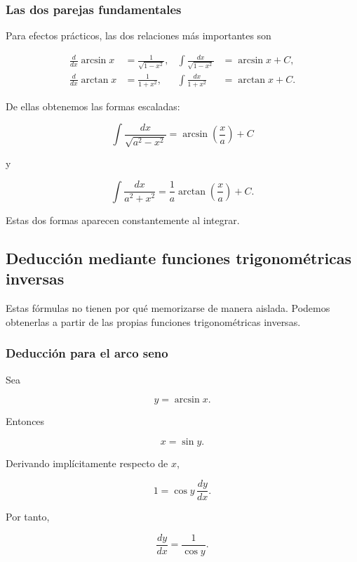 \subsubsection*{Las dos parejas fundamentales}

Para efectos prácticos, las dos relaciones más importantes son

\[
\boxed{
\begin{aligned}
\frac{d}{dx}\arcsin x
&=\frac{1}{\sqrt{1-x^2}},
&
\int\frac{dx}{\sqrt{1-x^2}}
&=\arcsin x+C,
\\[3mm]
\frac{d}{dx}\arctan x
&=\frac{1}{1+x^2},
&
\int\frac{dx}{1+x^2}
&=\arctan x+C.
\end{aligned}}
\]

De ellas obtenemos las formas escaladas:

\[
\boxed{
\int\frac{dx}{\sqrt{a^2-x^2}}
=
\arcsin\left(\frac{x}{a}\right)+C
}
\]

y

\[
\boxed{
\int\frac{dx}{a^2+x^2}
=
\frac1a\arctan\left(\frac{x}{a}\right)+C.
}
\]

Estas dos formas aparecen constantemente al integrar.

\subsection*{Deducción mediante funciones trigonométricas inversas}

Estas fórmulas no tienen por qué memorizarse de manera aislada.
Podemos obtenerlas a partir de las propias funciones trigonométricas
inversas.

\subsubsection*{Deducción para el arco seno}

Sea

\[
y=\arcsin x.
\]

Entonces

\[
x=\sin y.
\]

Derivando implícitamente respecto de \(x\),

\[
1=\cos y\,\frac{dy}{dx}.
\]

Por tanto,

\[
\frac{dy}{dx}
=
\frac1{\cos y}.
\]

